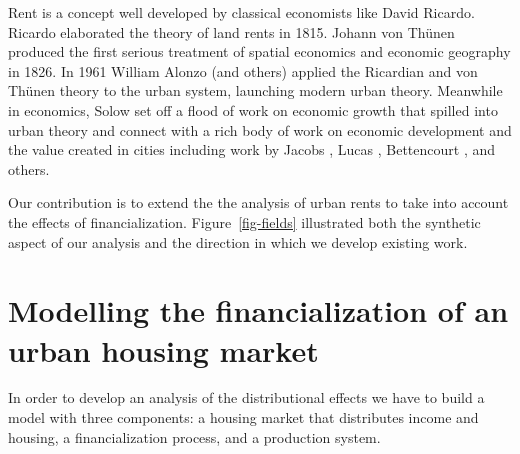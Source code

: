 Rent is a concept well developed by classical economists like David Ricardo. %
Ricardo \cite{ricardoEssayInfluenceLow1815} elaborated the theory of land rents in 1815. Johann von Th\"unen \cite{vonthunenIsolirteStaatBeziehung1826} %
produced the first serious treatment of spatial economics and economic geography %
in 1826. In 1961 William Alonzo (and others) \cite{alonsoModelUrbanLand1960} applied the  Ricardian and von Th\"unen theory to the urban system, launching modern urban theory. Meanwhile in economics, Solow \cite{solowContributionTheoryEconomic1956} set off a flood of work on economic growth that spilled into urban theory and connect with a rich body of work on economic development and the value created in cities including work by Jacobs \cite{jacobsEconomyCities1969}, Lucas \cite{lucasMechanicsEconomicDevelopment1988}, Bettencourt  \cite{bettencourtGrowthInnovationScaling2007}, and others. 

Our contribution is to extend the the analysis of urban rents to take into account the effects of financialization.
Figure~\ref{fig-fields} illustrated both the synthetic aspect of our analysis and the direction in which we develop existing work. %

\section{Modelling the financialization of an urban housing market}
In order to develop an analysis of the distributional effects we have to build a model with three components: a housing market that distributes income and housing, a financialization process, and a production system. 

